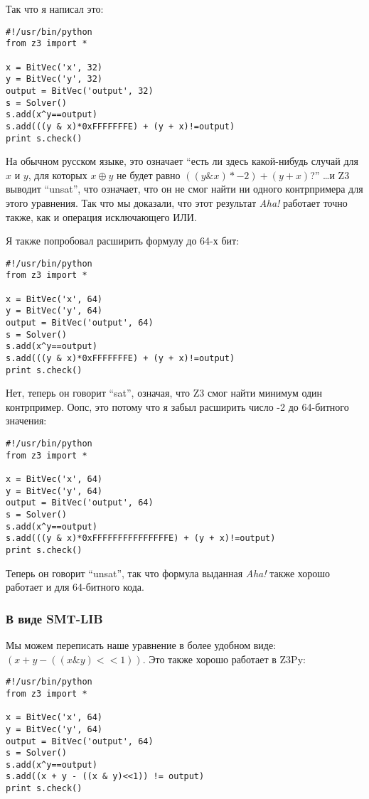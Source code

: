 Так что я написал это:

\begin{lstlisting}
#!/usr/bin/python
from z3 import *

x = BitVec('x', 32)
y = BitVec('y', 32)
output = BitVec('output', 32)
s = Solver()
s.add(x^y==output)
s.add(((y & x)*0xFFFFFFFE) + (y + x)!=output)
print s.check()
\end{lstlisting}

На обычном русском языке, это означает
``есть ли здесь какой-нибудь случай для $x$ и $y$, для которых $x \oplus y$ не будет равно $((y \& x)*-2) + (y + x)$?''
\dots и Z3 выводит ``unsat'', что означает, что он не смог найти ни одного контрпримера для этого уравнения.
Так что мы доказали, что этот результат \textit{Aha!} работает точно также, как и операция исключающего ИЛИ.

Я также попробовал расширить формулу до 64-х бит:

\begin{lstlisting}
#!/usr/bin/python
from z3 import *

x = BitVec('x', 64)
y = BitVec('y', 64)
output = BitVec('output', 64)
s = Solver()
s.add(x^y==output)
s.add(((y & x)*0xFFFFFFFE) + (y + x)!=output)
print s.check()
\end{lstlisting}

Нет, теперь он говорит ``sat'', означая, что Z3 смог найти минимум один контрпример.
Оопс, это потому что я забыл расширить число -2 до 64-битного значения:

\begin{lstlisting}
#!/usr/bin/python
from z3 import *

x = BitVec('x', 64)
y = BitVec('y', 64)
output = BitVec('output', 64)
s = Solver()
s.add(x^y==output)
s.add(((y & x)*0xFFFFFFFFFFFFFFFE) + (y + x)!=output)
print s.check()
\end{lstlisting}

Теперь он говорит ``unsat'', так что формула выданная \textit{Aha!} также хорошо работает и для 64-битного кода.

\subsubsection{В виде SMT-LIB}

Мы можем переписать наше уравнение в более удобном виде: $(x + y - ((x \& y)<<1))$.
Это также хорошо работает в Z3Py:

\begin{lstlisting}
#!/usr/bin/python
from z3 import *

x = BitVec('x', 64)
y = BitVec('y', 64)
output = BitVec('output', 64)
s = Solver()
s.add(x^y==output)
s.add((x + y - ((x & y)<<1)) != output)
print s.check()
\end{lstlisting}

